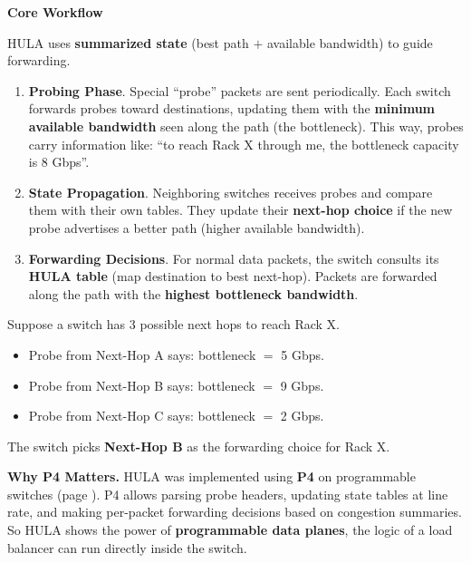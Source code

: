 \highspace
\begin{flushleft}
    \textcolor{Green3}{ \textbf{Core Workflow}}
\end{flushleft}
HULA uses \textbf{summarized state} (best path $+$ available bandwidth) to guide forwarding.
\begin{enumerate}
    \item \textbf{Probing Phase}. Special ``probe'' packets are sent periodically. Each switch forwards probes toward destinations, updating them with the \textbf{minimum available bandwidth} seen along the path (the bottleneck). This way, probes carry information like: ``to reach Rack X through me, the bottleneck capacity is 8 Gbps''.
    \item \textbf{State Propagation}. Neighboring switches receives probes and compare them with their own tables. They update their \textbf{next-hop choice} if the new probe advertises a better path (higher available bandwidth).
    \item \textbf{Forwarding Decisions}. For normal data packets, the switch consults its \textbf{HULA table} (map destination to best next-hop). Packets are forwarded along the path with the \textbf{highest bottleneck bandwidth}.
\end{enumerate}

\highspace
\begin{examplebox}
    Suppose a switch has 3 possible next hops to reach Rack X.
    \begin{itemize}
        \item Probe from Next-Hop A says: bottleneck $=$ 5 Gbps.
        \item Probe from Next-Hop B says: bottleneck $=$ 9 Gbps.
        \item Probe from Next-Hop C says: bottleneck $=$ 2 Gbps.
    \end{itemize}
    The switch picks \textbf{Next-Hop B} as the forwarding choice for Rack X.
\end{examplebox}

\noindent
\textcolor{Green3}{\faIcon{\speedIcon} \textbf{Why P4 Matters.}} HULA was implemented using \textbf{P4} on programmable switches (page \pageref{subsection: Data Plane Programming and P4}). P4 allows parsing probe headers, updating state tables at line rate, and making per-packet forwarding decisions based on congestion summaries. So HULA shows the power of \textbf{programmable data planes}, the logic of a load balancer can run directly inside the switch.

